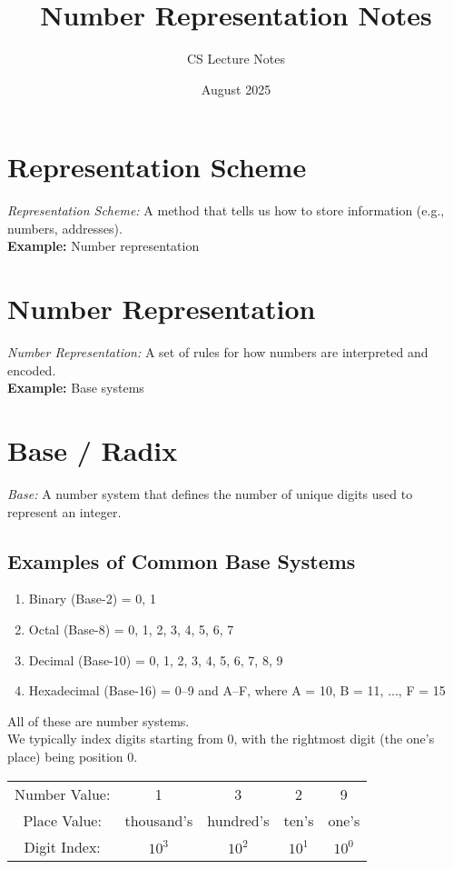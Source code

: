 \documentclass{article}
\title{Number Representation Notes}
\author{CS Lecture Notes}
\date{August 2025}
\begin{document}
\maketitle

\section{Representation Scheme}
\textit{Representation Scheme:} A method that tells us how to store information (e.g., numbers, addresses). \\

\noindent \textbf{Example:} Number representation

\section{Number Representation}
\textit{Number Representation:} A set of rules for how numbers are interpreted and encoded. \\

\noindent \textbf{Example:} Base systems

\section{Base / Radix}
\textit{Base:} A number system that defines the number of unique digits used to represent an integer. \\

\subsection*{Examples of Common Base Systems}
\begin{enumerate}
  \item Binary (Base-2) = 0, 1
  \item Octal (Base-8) = 0, 1, 2, 3, 4, 5, 6, 7
  \item Decimal (Base-10) = 0, 1, 2, 3, 4, 5, 6, 7, 8, 9
  \item Hexadecimal (Base-16) = 0--9 and A--F, where A = 10, B = 11, ..., F = 15
\end{enumerate}

\noindent All of these are number systems. \\

\noindent We typically index digits starting from 0, with the rightmost digit (the one's place) being position 0.

\begin{center}
\begin{tabular}{c c c c c}
Number Value: & 1 & 3 & 2 & 9 \\
Place Value:  & thousand's & hundred's & ten's & one's \\
Digit Index:  & $10^3$ & $10^2$ & $10^1$ & $10^0$ \\
\end{tabular}
\end{center}
\end{document}
